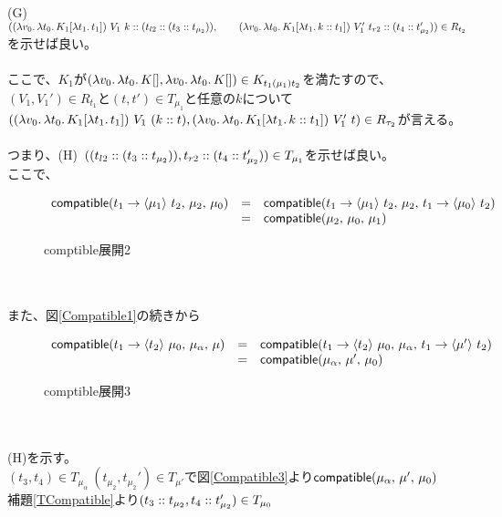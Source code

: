 (G)\ $(\LamP{v_0}{\Lam{t_0}{K_1[\Lam{t_1}{t_1}]}}\ V_1\ \Cons{k}{\ConsP{t_{l2}}{\ConsP{t_3}{t_{\mu_2}}}},\\
\qquad \LamP{v_0}{\Lam{t_0}{K_1[\Lam{t_1}{\Cons{k}{t_1}}]}}\ V_1'\ \Cons{t_{r2}}{\ConsP{t_4}{t_{\mu_2}'}})\in R_{t_2}$を示せば良い。\\
\\
ここで、$K_1$が$(\Lam{v_0}{\Lam{t_0}{K[]}}, \Lam{v_0}{\Lam{t_0}{K[]}})\in K_{t_1 (\mu_1) t_2}$を満たすので、\\
$(V_1,V_1')\in R_{t_1}$と$(t,t')\in T_{\mu_1}$と任意の$k$について\\
$(\LamP{v_0}{\Lam{t_0}{K_1[\Lam{t_1}{t_1}]}}\ V_1\ \ConsP{k}{t}, \LamP{v_0}{\Lam{t_0}{K_1[\Lam{t_1}{\Cons{k}{t_1}}]}}\ V_1'\ t)
\in R_{\tau_2}$が言える。\\
\\
つまり、(H)\ $(\ConsP{t_{l2}}{\ConsP{t_3}{t_{\mu_2}}},\Cons{t_{r2}}{\ConsP{t_4}{t_{\mu_2}'}})\in T_{\mu_1}$を示せば良い。
\\
ここで、\\
\begin{figure}[h]
\[
\begin{array}{lcl}
  \Compatible{\Trail{t_1}{t_2}{\mu_1}}{\mu_2}{\mu_0} &=& \Compatible{\Trail{t_1}{t_2}{\mu_1}}{\mu_2}{\Trail{t_1}{t_2}{\mu_0}}\\
  &=& \Compatible{\mu_2}{\mu_0}{\mu_1}
\end{array}
\]
\caption{\textsf{comptible}展開2}
\end{figure}\\
\\
また、図\ref{Compatible1}の続きから\\
\begin{figure}[h]
\[
\begin{array}{lcl}
  \Compatible{\Trail{t_1}{\mu_0}{t_2}}{\mu_{\alpha}}{\mu} &=& \Compatible{\Trail{t_1}{\mu_0}{t_2}}{\mu_{\alpha}}{\Trail{t_1}{t_2}{\mu'}}\\
  &=& \Compatible{\mu_{\alpha}}{\mu'}{\mu_0}
\end{array}
\]
\caption{\textsf{comptible}展開3}
\end{figure}\\
\\
(H)を示す。\\
$(t_3,t_4)\in T_{\mu_{\alpha}}\ (t_{\mu_2},t_{\mu_2}')\in T_{\mu'}$で図\ref{Compatible3}より$\Compatible{\mu_{\alpha}}{\mu'}{\mu_0}$\\
補題\ref{TCompatible}より$(\Cons{t_3}{t_{\mu_2}},\Cons{t_4}{t_{\mu_2}'})\in T_{\mu_0}$\\

